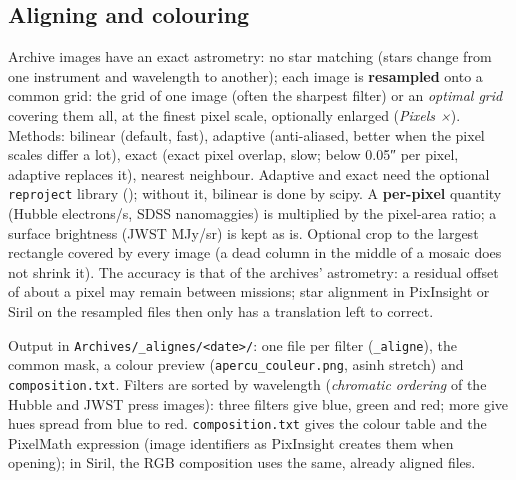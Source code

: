 \subsection{Aligning and colouring}
Archive images have an exact astrometry: no star matching (stars change from one instrument and wavelength to
another); each image is \textbf{resampled} onto a common grid: the grid of one image (often the sharpest filter) or an
\emph{optimal grid} covering them all, at the finest pixel scale, optionally enlarged (\emph{Pixels ×}). Methods:
bilinear (default, fast), adaptive (anti-aliased, better when the pixel scales differ a lot), exact (exact pixel
overlap, slow; below 0.05″ per pixel, adaptive replaces it), nearest neighbour. Adaptive and exact need the optional
\texttt{reproject} library (); without it, bilinear is done by scipy. A
\textbf{per-pixel} quantity (Hubble electrons/s, SDSS nanomaggies) is multiplied by the pixel-area ratio; a surface
brightness (JWST MJy/sr) is kept as is. Optional crop to the largest rectangle covered by every image (a dead column
in the middle of a mosaic does not shrink it). The accuracy is that of the archives' astrometry: a residual offset of
about a pixel may remain between missions; star alignment in PixInsight or Siril on the resampled files then only has
a translation left to correct.

Output in \texttt{Archives/\_alignes/<date>/}: one file per filter (\texttt{\_aligne}), the common mask, a colour
preview (\texttt{apercu\_couleur.png}, asinh stretch) and \texttt{composition.txt}. Filters are sorted by wavelength
(\emph{chromatic ordering} of the Hubble and JWST press images): three filters give blue, green and red; more give
hues spread from blue to red. \texttt{composition.txt} gives the colour table and the PixelMath expression (image
identifiers as PixInsight creates them when opening); in Siril, the RGB composition uses the same, already aligned
files.

